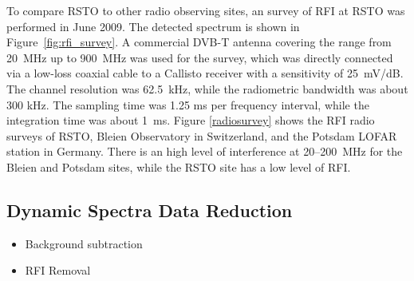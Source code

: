 To compare RSTO to other radio observing sites, an survey of RFI at RSTO was performed in June 2009. The detected spectrum is shown in Figure~\ref{fig:rfi_survey}.  A commercial DVB-T antenna covering the range from 20~MHz up to 900~MHz was used for the survey, which was directly connected via a low-loss coaxial cable to a Callisto receiver with a sensitivity of 25~mV/dB. The channel resolution was 62.5~kHz, while the radiometric bandwidth was about 300 kHz. The sampling time was 1.25 ms per frequency interval, while the integration time was about 1~ms.  Figure \ref{radiosurvey} shows the RFI radio surveys of RSTO, Bleien Observatory in Switzerland, and the Potsdam LOFAR station in Germany. There is an high level of interference at 20--200~MHz for the Bleien and Potsdam sites, while the RSTO site has a low level of RFI.

\subsection{Dynamic Spectra Data Reduction}
\begin{itemize}
\item Background subtraction
\item RFI Removal
\end{itemize}

